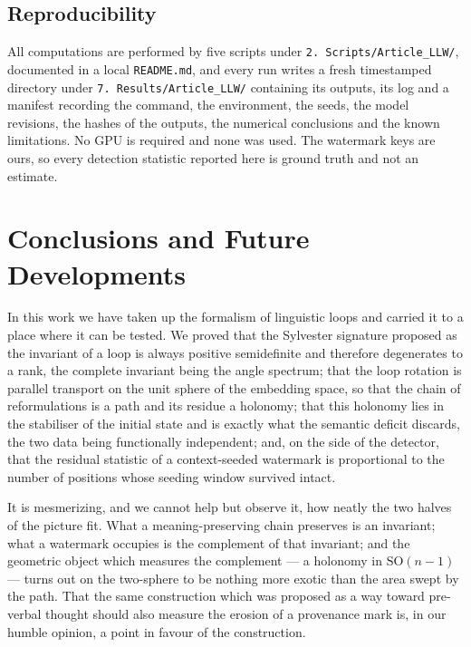 \documentclass[11pt,a4paper]{article}
\theoremstyle{plain}
\theoremstyle{definition}
\numberwithin{equation}{section}
\newcommand{\SO}{\mathrm{SO}}
\begin{document}

\subsection{Reproducibility}\label{sec:repro}

All computations are performed by five scripts under
\texttt{2.~Scripts/Article\_LLW/}, documented in a local
\texttt{README.md}, and every run writes a fresh timestamped directory
under \texttt{7.~Results/Article\_LLW/} containing its outputs, its log
and a manifest recording the command, the environment, the seeds, the
model revisions, the hashes of the outputs, the numerical conclusions
and the known limitations. No GPU is required and none was used. The
watermark keys are ours, so every detection statistic reported here is
ground truth and not an estimate.

\section{Conclusions and Future Developments}\label{sec:conclusions}

In this work we have taken up the formalism of linguistic loops and
carried it to a place where it can be tested. We proved that the
Sylvester signature proposed as the invariant of a loop is always
positive semidefinite and therefore degenerates to a rank, the complete
invariant being the angle spectrum; that the loop rotation is parallel
transport on the unit sphere of the embedding space, so that the chain
of reformulations is a path and its residue a holonomy; that this
holonomy lies in the stabiliser of the initial state and is exactly what
the semantic deficit discards, the two data being functionally
independent; and, on the side of the detector, that the residual
statistic of a context-seeded watermark is proportional to the number of
positions whose seeding window survived intact.

It is mesmerizing, and we cannot help but observe it, how neatly the two
halves of the picture fit. What a meaning-preserving chain preserves is
an invariant; what a watermark occupies is the complement of that
invariant; and the geometric object which measures the complement --- a
holonomy in $\SO(n-1)$ --- turns out on the two-sphere to be nothing
more exotic than the area swept by the path. That the same construction
which was proposed as a way toward pre-verbal thought should also
measure the erosion of a provenance mark is, in our humble opinion, a
point in favour of the construction.
\end{document}
